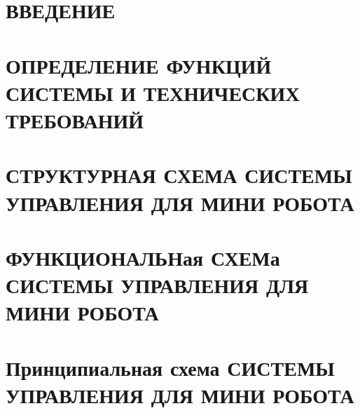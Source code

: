 
\section*{ВВЕДЕНИЕ}


\section{ОПРЕДЕЛЕНИЕ ФУНКЦИЙ СИСТЕМЫ И ТЕХНИЧЕСКИХ ТРЕБОВАНИЙ}


\section{СТРУКТУРНАЯ СХЕМА СИСТЕМЫ УПРАВЛЕНИЯ ДЛЯ МИНИ РОБОТА }


\section{ФУНКЦИОНАЛЬНая СХЕМа СИСТЕМЫ УПРАВЛЕНИЯ ДЛЯ МИНИ РОБОТА}


\section{Принципиальная схема СИСТЕМЫ УПРАВЛЕНИЯ ДЛЯ МИНИ РОБОТА}








% 
